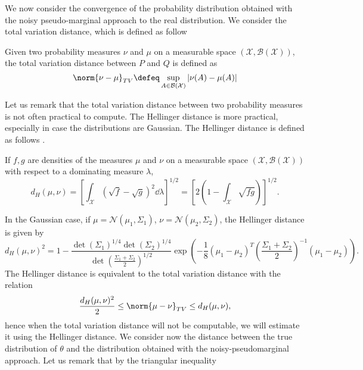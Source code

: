 We now consider the convergence of the probability distribution obtained with the noisy pseudo-marginal approach to the real distribution. We consider the total variation distance, which is defined as follow \cite{GiS02}
\begin{definition} Given two probability measures $\nu$ and $\mu$ on a measurable space $(\mathcal{X}, \mathcal{B}(\mathcal{X}))$, the total variation distance between $P$ and $Q$ is defined as
\begin{equation}
	\norm{\nu-\mu}_{TV} \defeq \sup_{A\in \mathcal{B}(\mathcal{X})} \left|\nu(A) - \mu(A)\right|
\end{equation}
\end{definition}
\noindent Let us remark that the total variation distance between two probability measures is not often practical to compute. The Hellinger distance is more practical, especially in case the distributions are Gaussian. The Hellinger distance is defined as follows \cite{GiS02}.
\begin{definition} If $f, g$ are densities of the measures $\mu$ and $\nu$ on a measurable space $(\mathcal{X}, \mathcal{B}(\mathcal{X}))$ with respect to a dominating measure $\lambda$, 
\begin{equation}
	d_H(\mu, \nu) = \left[\int_{\mathcal{X}}\left(\sqrt{f} - \sqrt{g}\right)^2\dd \lambda\right]^{1/2} = \left[2\left(1-\int_{\mathcal{X}}\sqrt{fg}\right)\right]^{1/2}.
\end{equation}
\end{definition}
\noindent In the Gaussian case, if $\mu=\mathcal{N}(\mu_1, \Sigma_1)$, $\nu=\mathcal{N}(\mu_2,\Sigma_2)$, the Hellinger distance is given by
\begin{equation}
 d_H(\mu, \nu)^2 = 1 - \frac{ \det (\Sigma_1)^{1/4} \det (\Sigma_2) ^{1/4}} { \det \left( \frac{\Sigma_1 + \Sigma_2}{2}\right)^{1/2} }
 \exp\left(-\frac{1}{8}(\mu_1 - \mu_2)^T 
 \left(\frac{\Sigma_1 + \Sigma_2}{2}\right)^{-1}
 (\mu_1 - \mu_2)              
 \right).
\end{equation} 
The Hellinger distance is equivalent to the total variation distance with the relation \cite{GiS02}
\begin{equation}\label{eq:TVvsHell}
	\frac{d_H(\mu, \nu)^2}{2} \leq \norm{\mu-\nu}_{TV} \leq d_H(\mu, \nu),
\end{equation}
hence when the total variation distance will not be computable, we will estimate it using the Hellinger distance. We consider now the distance between the true distribution of $\theta$ and the distribution obtained with the noisy-pseudomarginal approach. Let us remark that by the triangular inequality
